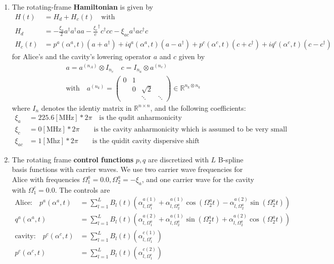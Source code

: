 \documentclass[letterpaper]{article}
\newcommand{\R}{\mathds{R}}
\begin{document}
\begin{enumerate}
  \item The rotating-frame \textbf{Hamiltonian} is given by 
    \begin{align}
        H(t) &= H_d + H_c(t) \quad \text{with} \\
        H_d  &= -\frac{\xi_a}{2} a^\dagger a^\dagger a a - \frac{\xi_c} c^\dagger c^\dagger c c - \xi_{ac} a^\dagger a c^\dagger c \\ 
        H_c(t) &= p^a(\alpha^a,t) (a+a^\dagger) + iq^a(\alpha^a, t)(a-a^\dagger) + p^c(\alpha^c,t)(c+c^\dagger) + iq^c(\alpha^c,t)(c-c^\dagger)
    \end{align}
    for Alice's and the cavity's lowering operator $a$ and $c$ given by 
    \begin{align}
        a = a^{(n_A)} \otimes I_{n_c} \quad c = I_{n_a} \otimes a^{(n_c)}  \\
        \text{with} \quad a^{(n_k)} = \begin{pmatrix} 0 & 1 & \\ & 0 & \sqrt{2} & \\ & & \ddots  & \ddots \end{pmatrix} \in \R^{n_k\otimes n_k}
    \end{align}
    where $I_n$ denotes the identiy matrix in $\R^{n\times n}$, and the following coefficients:
    \begin{align}
        \xi_a &= 225.6 [\text{MHz}] * 2\pi \quad \text{is the qudit anharmonicity} \\
        \xi_c &= 0 [\text{MHz}] * 2\pi  \quad \quad\text{is the cavity anharmonicity which is assumed to be very small} \\
        \xi_{ac} &= 1 [\text{Mhz}] * 2\pi \quad \quad\text{is the quidit cavity dispersive shift}
    \end{align}

  \item The rotating frame \textbf{control functions} $p,q$ are discretized with $L$ B-spline basis functions with carrier waves. We use two carrier wave frequencies for Alice with frequencies $\Omega^a_1 = 0.0, \Omega^a_2 = -\xi_a$, and one carrier wave for the cavity with $\Omega^c_1 = 0.0$. The controls are 
   \begin{align}
       \text{Alice:} \quad p^a(\alpha^a,t) &= \sum_{l=1}^L B_l(t) \left(\alpha^{a(1)}_{l,\Omega^a_1} + \alpha^{a(1)}_{l,\Omega^a_2}\cos(\Omega^a_2 t) - \alpha^{a(2)}_{l,\Omega^a_2}\sin(\Omega^a_2 t) \right)\\
       q^a(\alpha^a,t) &= \sum_{l=1}^L B_l(t) \left(\alpha^{a(2)}_{l,\Omega^a_1} + \alpha^{a(1)}_{l,\Omega^a_2}\sin(\Omega^a_2 t) + \alpha^{a(2)}_{l,\Omega^a_2}\cos(\Omega^a_2 t) \right) \\
       \text{cavity:} \quad p^c(\alpha^c,t) &= \sum_{l=1}^L B_l(t) \left( \alpha^{c(1)}_{l,\Omega^c_1} \right) \\
       p^c(\alpha^c,t) &= \sum_{l=1}^L B_l(t) \left( \alpha^{c(2)}_{l,\Omega^c_1} \right) 
   \end{align}


\end{enumerate}
\end{document}
